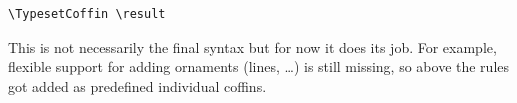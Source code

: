 \documentclass{article}
\begin{document}
\begin{center}
\begin{minipage}{14cm}
\begin{verbatim}
\TypesetCoffin \result
\end{verbatim}

This is not necessarily the final syntax but for now it does its job. For
example, flexible support for adding ornaments (lines, \ldots) is still
missing, so above the rules got added as predefined individual coffins.

\end{minipage}
\end{center}
\end{document}
